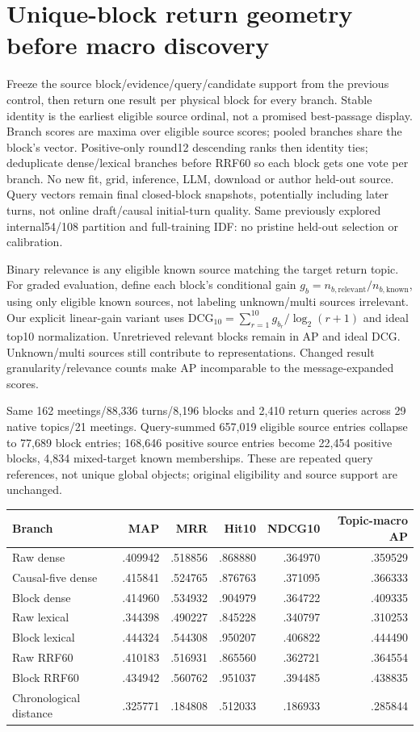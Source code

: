 \documentclass[11pt]{article}
\begin{document}
\section{Unique-block return geometry before macro discovery}
Freeze the source block/evidence/query/candidate support from the previous control,
then return one result per physical block for every branch. Stable identity is the
earliest eligible source ordinal, not a promised best-passage display. Branch
scores are maxima over eligible source scores; pooled branches share the block's
vector. Positive-only round12 descending ranks then identity ties; deduplicate
dense/lexical branches before RRF60 so each block gets one vote per branch.
No new fit, grid, inference, LLM, download or author held-out source. Query vectors
remain final closed-block snapshots, potentially including later turns, not online
draft/causal initial-turn quality. Same previously explored internal54/108 partition
and full-training IDF: no pristine held-out selection or calibration.

Binary relevance is any eligible known source matching the target return topic.
For graded evaluation\cite{jarvelin2002}, define each block's conditional gain
$g_b=n_{b,\mathrm{relevant}}/n_{b,\mathrm{known}}$, using only eligible known
sources, not labeling unknown/multi sources irrelevant. Our explicit linear-gain
variant uses $\mathrm{DCG}_{10}=\sum_{r=1}^{10}g_{b_r}/\log_2(r+1)$ and ideal
top10 normalization. Unretrieved relevant blocks remain in AP and ideal DCG.
Unknown/multi sources still contribute to representations. Changed result
granularity/relevance counts make AP incomparable to the message-expanded scores.

Same 162 meetings/88,336 turns/8,196 blocks and 2,410 return queries across 29
native topics/21 meetings. Query-summed 657,019 eligible source entries collapse
to 77,689 block entries; 168,646 positive source entries become 22,454 positive
blocks, 4,834 mixed-target known memberships. These are repeated query references,
not unique global objects; original eligibility and source support are unchanged.

\begin{center}\small
\begin{tabular}{lrrrrr}
Branch & MAP & MRR & Hit10 & NDCG10 & Topic-macro AP \\\hline
Raw dense & .409942 & .518856 & .868880 & .364970 & .359529 \\
Causal-five dense & .415841 & .524765 & .876763 & .371095 & .366333 \\
Block dense & .414960 & .534932 & .904979 & .364722 & .409335 \\
Raw lexical & .344398 & .490227 & .845228 & .340797 & .310253 \\
Block lexical & .444324 & .544308 & .950207 & .406822 & .444490 \\
Raw RRF60 & .410183 & .516931 & .865560 & .362721 & .364554 \\
Block RRF60 & .434942 & .560762 & .951037 & .394485 & .438835 \\
Chronological distance & .325771 & .184808 & .512033 & .186933 & .285844
\end{tabular}\end{center}
\end{document}

